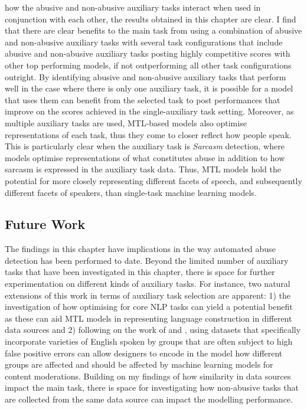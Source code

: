  how the abusive and non-abusive auxiliary tasks interact when used in conjunction with each other, the results obtained in this chapter are clear.
I find that there are clear benefits to the main task from using a combination of abusive and non-abusive auxiliary tasks with several task configurations that include abusive and non-abusive auxiliary tasks posting highly competitive scores with other top performing models, if not outperforming all other task configurations outright.
By identifying abusive and non-abusive auxiliary tasks that perform well in the case where there is only one auxiliary task, it is possible for a model that uses them can benefit from the selected task to post performances that improve on the scores achieved in the single-auxiliary task setting.
Moreover, as multiple auxiliary tasks are used, MTL-based models also optimise representations of each task, thus they come to closer reflect how people speak.
This is particularly clear when the auxiliary task is \textit{Sarcasm} detection, where models optimise representations of what constitutes abuse in addition to how sarcasm is expressed in the auxiliary task data.
Thus, MTL models hold the potential for more closely representing different facets of speech, and subsequently different facets of speakers, than single-task machine learning models.

\subsection{Future Work}
The findings in this chapter have implications in the way automated abuse detection has been performed to date.
Beyond the limited number of auxiliary tasks that have been investigated in this chapter, there is space for further experimentation on different kinds of auxiliary tasks.
For instance, two natural extensions of this work in terms of auxiliary task selection are apparent: 1) the investigation of how optimising for core NLP tasks can yield a potential benefit as these can aid MTL models in representing language construction in different data sources and 2) following on the work of \citet{Davidson:2019} and \citet{Dias:2021}, using datasets that specifically incorporate varieties of English spoken by groups that are often subject to high false positive errors can allow designers to encode in the model how different groups are affected and should be affected by machine learning models for content moderations.
Building on my findings of how similarity in data sources impact the main task, there is space for investigating how non-abusive tasks that are collected from the same data source can impact the modelling performance.

